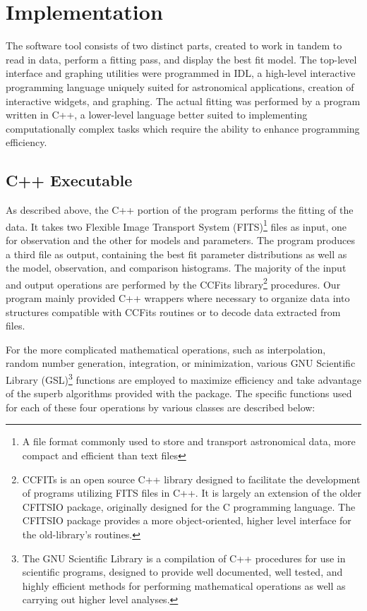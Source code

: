 \documentclass[twocolumn,letterpaper,10pt]{article}
\begin{document}
\section{Implementation}

The software tool consists of two distinct parts, created to work in tandem to read in data, perform a fitting pass, and display the best fit model. The top-level interface and graphing utilities were programmed in IDL, a high-level interactive programming language uniquely suited for astronomical applications, creation of interactive widgets, and graphing. The actual fitting was performed by a program written in C++, a lower-level language better suited to implementing computationally complex tasks which require the ability to enhance programming efficiency.

\subsection{C++ Executable}

As described above, the C++ portion of the program performs the fitting of the data. It takes two Flexible Image Transport System (FITS)\footnote{A file format commonly used to store and transport astronomical data, more compact and efficient than text files} files as input, one for observation and the other for models and parameters. The program produces a third file as output, containing the best fit parameter distributions as well as the model, observation, and comparison histograms. The majority of the input and output operations are performed by the CCFits library\footnote{CCFITs \citep{CCFITS} is an open source C++ library designed to facilitate the development of programs utilizing FITS files in C++. It is largely an extension of the older CFITSIO \citep{CFITSIO} package, originally designed for the C programming language. The CFITSIO package provides a more object-oriented, higher level interface for the old-library's routines.} procedures. Our program mainly provided C++ wrappers where necessary to organize data into structures compatible with CCFits routines or to decode data extracted from files. 

For the more complicated mathematical operations, such as interpolation, random number generation, integration, or minimization, various GNU Scientific Library (GSL)\footnote{The GNU Scientific Library \citep[GSL, ][]{GSL} is a compilation of C++ procedures for use in scientific programs, designed to provide well documented, well tested, and highly efficient methods for performing mathematical operations as well as carrying out higher level analyses.} functions are employed to maximize efficiency and take advantage of the superb algorithms provided with the package. The specific functions used for each of these four operations by various classes are described below:
\end{document}
